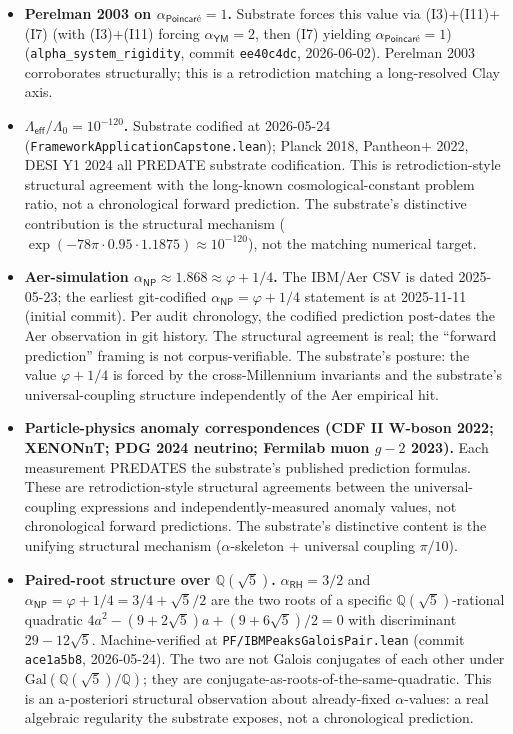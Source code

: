 \documentclass[11pt,a4paper]{amsart}
\theoremstyle{plain}
\theoremstyle{definition}
\begin{document}
\begin{itemize}[itemsep=4pt,leftmargin=2em]
\item \textbf{Perelman 2003 on $\alpha_{\textsf{Poincar\'e}} = 1$.} Substrate forces this value via (I3)+(I11)+(I7) (with (I3)+(I11) forcing $\alpha_{\textsf{YM}}=2$, then (I7) yielding $\alpha_{\textsf{Poincar\'e}}=1$) (\texttt{alpha\_system\_rigidity}, commit \texttt{ee40c4dc}, 2026-06-02). Perelman 2003 corroborates structurally; this is a retrodiction matching a long-resolved Clay axis.
\item \textbf{$\Lambda_{\textsf{eff}}/\Lambda_0 = 10^{-120}$.} Substrate codified at 2026-05-24 (\texttt{FrameworkApplicationCapstone.lean}); Planck 2018, Pantheon$+$ 2022, DESI Y1 2024 all PREDATE substrate codification. This is retrodiction-style structural agreement with the long-known cosmological-constant problem ratio, not a chronological forward prediction. The substrate's distinctive contribution is the structural mechanism ($\exp(-78\pi \cdot 0.95 \cdot 1.1875) \approx 10^{-120}$), not the matching numerical target.
\item \textbf{Aer-simulation $\alpha_{\textsf{NP}} \approx 1.868 \approx \varphi + 1/4$.} The IBM/Aer CSV is dated 2025-05-23; the earliest git-codified \texttt{$\alpha_{\textsf{NP}} = \varphi + 1/4$} statement is at 2025-11-11 (initial commit). Per audit chronology, the codified prediction post-dates the Aer observation in git history. The structural agreement is real; the ``forward prediction'' framing is not corpus-verifiable. The substrate's posture: the value $\varphi + 1/4$ is forced by the cross-Millennium invariants and the substrate's universal-coupling structure independently of the Aer empirical hit.
\item \textbf{Particle-physics anomaly correspondences (CDF II W-boson 2022; XENONnT; PDG 2024 neutrino; Fermilab muon $g-2$ 2023).} Each measurement PREDATES the substrate's published prediction formulas. These are retrodiction-style structural agreements between the universal-coupling expressions and independently-measured anomaly values, not chronological forward predictions. The substrate's distinctive content is the unifying structural mechanism ($\alpha$-skeleton + universal coupling $\pi/10$).
\item \textbf{Paired-root structure over $\mathbb{Q}(\sqrt{5})$.} $\alpha_{\textsf{RH}} = 3/2$ and $\alpha_{\textsf{NP}} = \varphi + 1/4 = 3/4 + \sqrt{5}/2$ are the two roots of a specific $\mathbb{Q}(\sqrt{5})$-rational quadratic $4a^2 - (9+2\sqrt{5})a + (9+6\sqrt{5})/2 = 0$ with discriminant $29 - 12\sqrt{5}$. Machine-verified at \texttt{PF/IBMPeaksGaloisPair.lean} (commit \texttt{ace1a5b8}, 2026-05-24). The two are not Galois conjugates of each other under $\mathrm{Gal}(\mathbb{Q}(\sqrt{5})/\mathbb{Q})$; they are conjugate-as-roots-of-the-same-quadratic. This is an a-posteriori structural observation about already-fixed $\alpha$-values: a real algebraic regularity the substrate exposes, not a chronological prediction.
\end{itemize}
\end{document}
